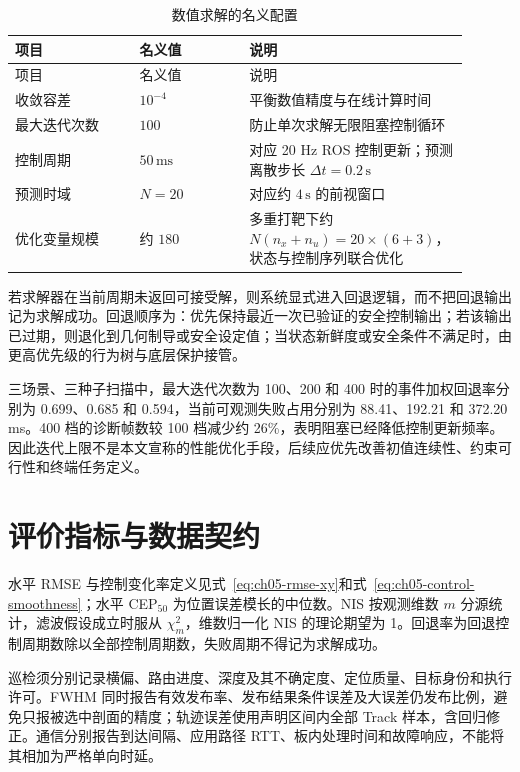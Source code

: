 \begin{longtable}{@{}>{\raggedright\arraybackslash}p{0.25\linewidth}>{\raggedright\arraybackslash}p{0.22\linewidth}>{\raggedright\arraybackslash}p{0.43\linewidth}@{}}
\caption{数值求解的名义配置}\label{tab:app-a-solver}\\
\toprule
项目 & 名义值 & 说明 \\
\midrule
\endfirsthead
\toprule
项目 & 名义值 & 说明 \\
\midrule
\endhead
\bottomrule
\endfoot
收敛容差 & \(10^{-4}\) & 平衡数值精度与在线计算时间 \\
最大迭代次数 & \(100\) & 防止单次求解无限阻塞控制循环 \\
控制周期 & \(50\,\mathrm{ms}\) & 对应 20 Hz ROS 控制更新；预测离散步长 \(\Delta t=0.2\,\mathrm{s}\) \\
预测时域 & \(N=20\) & 对应约 \(4\,\mathrm{s}\) 的前视窗口 \\
优化变量规模 & 约 \(180\) & 多重打靶下约 \(N(n_x+n_u)=20\times(6+3)\)，状态与控制序列联合优化 \\
\end{longtable}

若求解器在当前周期未返回可接受解，则系统显式进入回退逻辑，而不把回退输出记为求解成功。回退顺序为：优先保持最近一次已验证的安全控制输出；若该输出已过期，则退化到几何制导或安全设定值；当状态新鲜度或安全条件不满足时，由更高优先级的行为树与底层保护接管。

三场景、三种子扫描中，最大迭代次数为 100、200 和 400 时的事件加权回退率分别为 0.699、0.685 和 0.594，当前可观测失败占用分别为 88.41、192.21 和 372.20 ms。400 档的诊断帧数较 100 档减少约 26\%，表明阻塞已经降低控制更新频率。因此迭代上限不是本文宣称的性能优化手段，后续应优先改善初值连续性、约束可行性和终端任务定义。

\section{评价指标与数据契约}\label{sec:app-a-6}

水平 RMSE 与控制变化率定义见式~\eqref{eq:ch05-rmse-xy}和式~\eqref{eq:ch05-control-smoothness}；水平 CEP$_{50}$ 为位置误差模长的中位数。NIS 按观测维数 $m$ 分源统计，滤波假设成立时服从 $\chi_m^2$，维数归一化 NIS 的理论期望为 1。回退率为回退控制周期数除以全部控制周期数，失败周期不得记为求解成功。

巡检须分别记录横偏、路由进度、深度及其不确定度、定位质量、目标身份和执行许可。FWHM 同时报告有效发布率、发布结果条件误差及大误差仍发布比例，避免只报被选中剖面的精度；轨迹误差使用声明区间内全部 Track 样本，含回归修正。通信分别报告到达间隔、应用路径 RTT、板内处理时间和故障响应，不能将其相加为严格单向时延。

